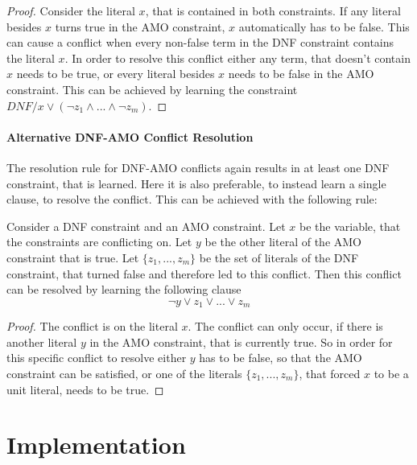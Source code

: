 \begin{proof}
Consider the literal $x$, that is contained in both constraints. If any literal besides $x$ turns true in the AMO constraint, $x$ automatically has to be false. This can cause a conflict when every non-false term in the DNF constraint contains the literal $x$. In order to resolve this conflict either any term, that doesn't contain $x$ needs to be true, or every literal besides $x$ needs to be false in the AMO constraint. This can be achieved by learning the constraint $DNF / x \vee (\neg z_1 \wedge ... \wedge \neg z_m)$.
\end{proof}

\subsubsection{Alternative DNF-AMO Conflict Resolution}

The resolution rule for DNF-AMO conflicts again results in at least one DNF constraint, that is learned. Here it is also preferable, to instead learn a single clause, to resolve the conflict. This can be achieved with the following rule:


\begin{lemma}
\begin{leftbar}
Consider a DNF constraint and an AMO constraint. Let $x$ be the variable, that the constraints are conflicting on. Let $y$ be the other literal of the AMO constraint that is true. Let $\{z_1,...,z_m\}$ be the set of literals of the DNF constraint, that turned false and therefore led to this conflict. Then this conflict can be resolved by learning the following clause
\begin{displaymath}
\neg y \vee z_1 \vee ... \vee z_m
\end{displaymath}
\end{leftbar}
\end{lemma}

\begin{proof}
The conflict is on the literal $x$. The conflict can only occur, if there is another literal $y$ in the AMO constraint, that is currently true. So in order for this specific conflict to resolve either $y$ has to be false, so that the AMO constraint can be satisfied, or one of the literals $\{z_1,...,z_m\}$, that forced $x$ to be a unit literal, needs to be true.
\end{proof}

\chapter{Implementation}
\label{ch:Implementation}

